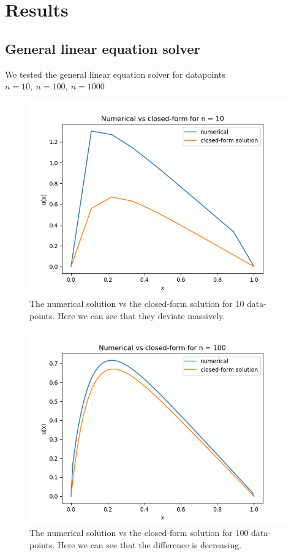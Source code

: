 \documentclass[a4paper,12pt,norsk]{article}
\begin{document}
\section{Results}
	\subsection{General linear equation solver}
	We tested the general linear equation solver for datapoints $n = 10,\ n= 100,\ n=1000$
	\begin{figure}[H]
		\includegraphics[scale = 0.7]{Figures/Figure_1.png}
		\centering
		\caption{The numerical solution vs the closed-form solution for 10 data-points. Here we can see that they deviate massively.}
	\end{figure}

	\begin{figure}[H]
		\includegraphics[scale = 0.7]{Figures/Figure_2.png}
		\centering
		\caption{The numerical solution vs the closed-form solution for 100 data-points. Here we can see that the difference is decreasing.}
	\end{figure}
\end{document}
